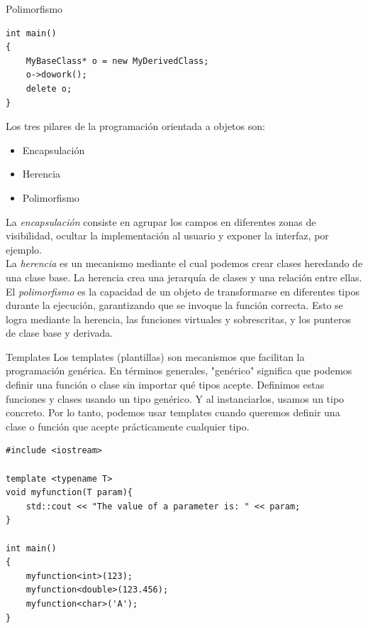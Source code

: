 \documentclass[11pt]{beamer}
\begin{document}
\begin{frame}[fragile]{Polimorfismo}
\begin{lstlisting}
int main()
{
	MyBaseClass* o = new MyDerivedClass;
	o->dowork();
	delete o;
}
\end{lstlisting}	
\end{frame}


\begin{frame}
	\small
Los tres pilares de la programación orientada a objetos son:

\begin{itemize}
	\item Encapsulación
	\item Herencia
	\item Polimorfismo
\end{itemize}
\vspace{2mm}
	
La \textit{encapsulación} consiste en agrupar los campos en diferentes zonas de visibilidad, ocultar la implementación al usuario y exponer la interfaz, por ejemplo.\\
La \textit{herencia} es un mecanismo mediante el cual podemos crear clases heredando de una clase base. La herencia crea una jerarquía de clases y una relación entre ellas.\\
El \textit{polimorfismo} es la capacidad de un objeto de transformarse en diferentes tipos durante la ejecución, garantizando que se invoque la función correcta. Esto se logra mediante la herencia, las funciones virtuales y sobrescritas, y los punteros de clase base y derivada.
\end{frame}


\begin{frame}[fragile]{Templates}
\small	
Los templates (plantillas) son mecanismos que facilitan la programación genérica. En términos generales, "genérico" significa que podemos definir una función o clase sin importar qué tipos acepte. Definimos estas funciones y clases usando un tipo genérico. Y al instanciarlos, usamos un tipo concreto. Por lo tanto, podemos usar templates cuando queremos definir una clase o función que acepte prácticamente cualquier tipo.	
	
\begin{lstlisting}
#include <iostream>

template <typename T>
void myfunction(T param){
	std::cout << "The value of a parameter is: " << param;
}

int main()
{
	myfunction<int>(123);
	myfunction<double>(123.456);
	myfunction<char>('A');
}	
\end{lstlisting}	
\end{frame}
\end{document}
